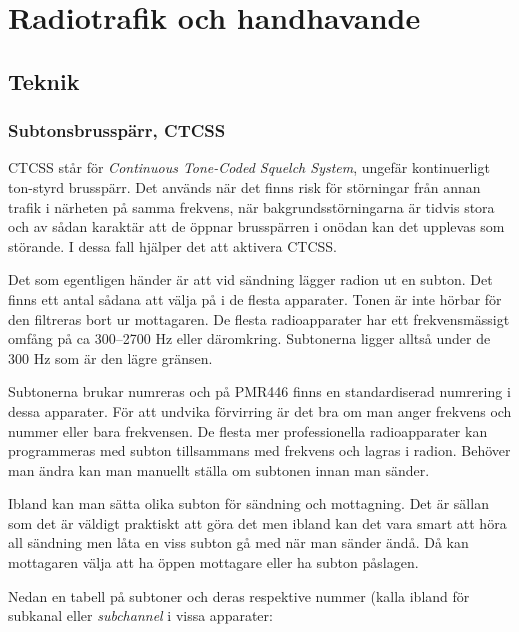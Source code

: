 \chapter{Radiotrafik och handhavande}
\label{kap:radiotrafik}

\section{Teknik}

\subsection{Subtonsbrusspärr, CTCSS}

CTCSS står för \textit{Continuous Tone-Coded Squelch System}, ungefär kontinuerligt ton-styrd brusspärr. Det används när det finns risk för störningar från annan trafik i närheten på samma frekvens, när bakgrundsstörningarna är tidvis stora och av sådan karaktär att de öppnar brusspärren i onödan kan det upplevas som störande. I dessa fall hjälper det att aktivera CTCSS.

Det som egentligen händer är att vid sändning lägger radion ut en subton. Det finns ett antal sådana att välja på i de flesta apparater. Tonen är inte hörbar för den filtreras bort ur mottagaren. De flesta radioapparater har ett frekvensmässigt omfång på ca 300--2700 Hz eller däromkring. Subtonerna ligger alltså under de 300 Hz som är den lägre gränsen.

Subtonerna brukar numreras och på PMR446 finns en standardiserad numrering i dessa apparater. För att undvika förvirring är det bra om man anger frekvens och nummer eller bara frekvensen. De flesta mer professionella radioapparater kan programmeras med subton tillsammans med frekvens och lagras i radion. Behöver man ändra kan man manuellt ställa om subtonen innan man sänder.

Ibland kan man sätta olika subton för sändning och mottagning. Det är sällan som det är väldigt praktiskt att göra det men ibland kan det vara smart att höra all sändning men låta en viss subton gå med när man sänder ändå. Då kan mottagaren välja att ha öppen mottagare eller ha subton påslagen.

Nedan en tabell på subtoner och deras respektive nummer (kalla ibland för subkanal eller \textit{subchannel} i vissa apparater:

